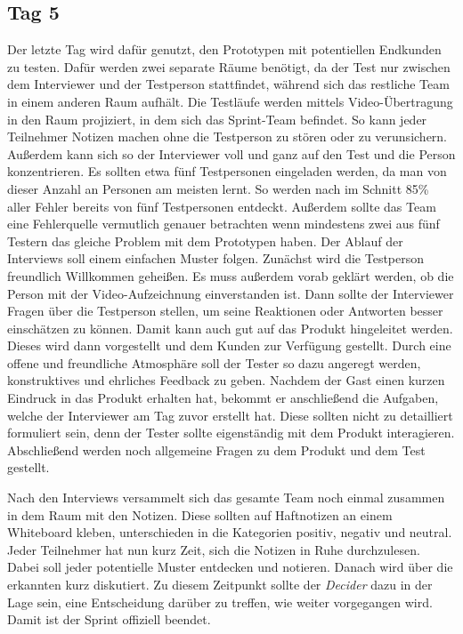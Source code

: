 \subsection*{\label{sec:Sprint-Tag5}\thesubsection\quad Tag 5}
Der letzte Tag wird dafür genutzt, den Prototypen mit potentiellen Endkunden zu testen. Dafür werden zwei separate Räume benötigt, da der Test nur zwischen dem Interviewer und der Testperson stattfindet, während sich das restliche Team in einem anderen Raum aufhält. Die Testläufe werden mittels Video-Übertragung in den Raum projiziert, in dem sich das Sprint-Team befindet. So kann jeder Teilnehmer Notizen machen ohne die Testperson zu stören oder zu verunsichern. Außerdem kann sich so der Interviewer voll und ganz auf den Test und die Person konzentrieren. Es sollten etwa fünf Testpersonen eingeladen werden, da man von dieser Anzahl an Personen am meisten lernt. So werden nach  im Schnitt 85\% aller Fehler bereits von fünf Testpersonen entdeckt. Außerdem sollte das Team eine Fehlerquelle vermutlich genauer betrachten wenn mindestens zwei aus fünf Testern das gleiche Problem mit dem Prototypen haben.
Der Ablauf der Interviews soll einem einfachen Muster folgen. Zunächst wird die Testperson freundlich Willkommen geheißen. Es muss außerdem vorab geklärt werden, ob die Person mit der Video-Aufzeichnung einverstanden ist. Dann sollte der Interviewer Fragen über die Testperson stellen, um seine Reaktionen oder Antworten besser einschätzen zu können. Damit kann auch gut auf das Produkt hingeleitet werden. Dieses wird dann vorgestellt und dem Kunden zur Verfügung gestellt. Durch eine offene und freundliche Atmosphäre soll der Tester so dazu angeregt werden, konstruktives und ehrliches Feedback zu geben. Nachdem der Gast einen kurzen Eindruck in das Produkt erhalten hat, bekommt er anschließend die Aufgaben, welche der Interviewer am Tag zuvor erstellt hat. Diese sollten nicht zu detailliert formuliert sein, denn der Tester sollte eigenständig mit dem Produkt interagieren. Abschließend werden noch allgemeine Fragen zu dem Produkt und dem Test gestellt.

Nach den Interviews versammelt sich das gesamte Team noch einmal zusammen in dem Raum mit den Notizen. Diese sollten auf Haftnotizen an einem Whiteboard kleben, unterschieden in die Kategorien positiv, negativ und neutral. Jeder Teilnehmer hat nun kurz Zeit, sich die Notizen in Ruhe durchzulesen. Dabei soll jeder potentielle Muster entdecken und notieren. Danach wird über die erkannten kurz diskutiert. Zu diesem Zeitpunkt sollte der \textit{Decider} dazu in der Lage sein, eine Entscheidung darüber zu treffen, wie weiter vorgegangen wird. Damit ist der Sprint offiziell beendet.

